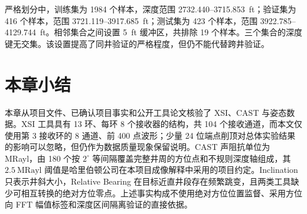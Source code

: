 严格划分中，训练集为 1984 个样本，深度范围 2732.440--3715.853~ft；验证集为 416 个样本，范围 3721.119--3917.685~ft；测试集为 423 个样本，范围 3922.785--4129.744~ft。相邻集合之间设置 5~ft 缓冲区，共排除 19 个样本。三个集合的深度键无交集。该设置提高了同井验证的严格程度，但仍不能代替跨井验证。

\section{本章小结}

本章从项目文件、已确认项目事实和公开工具论文核验了 XSI、CAST 与姿态数据。XSI 工具具有 13 环、每环 8 个接收器的结构，共 104 个接收通道，而本文仅使用第 3 接收环的 8 通道、前 400 点波形；少量 24 位端点削顶对总体实验结果的影响可以忽略，但仍作为数据质量现象保留说明。CAST 声阻抗单位为 MRayl，由 180 个按 $2^\circ$ 等间隔覆盖完整井周的方位点和不规则深度轴组成，其 $2.5~\mathrm{MRayl}$ 阈值是哈里伯顿公司在本项目成像解释中采用的项目约定。Inclination 只表示井斜大小，Relative Bearing 在目标近直井段存在频繁跳变，且两类工具缺少可相互转换的绝对方位零点。上述事实构成不使用绝对方位位置监督、采用方位向 FFT 幅值标签和深度区间隔离验证的直接依据。
